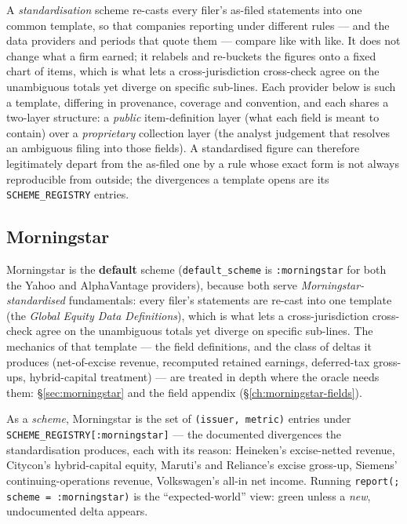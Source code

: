 \documentclass[11pt,a4paper]{report}
\begin{document}
A \emph{standardisation} scheme re-casts every filer's as-filed statements into one common template, so that
companies reporting under different rules --- and the data providers and periods that quote them --- compare
like with like. It does not change what a firm earned; it relabels and re-buckets the figures onto a fixed
chart of items, which is what lets a cross-jurisdiction cross-check agree on the unambiguous totals yet
diverge on specific sub-lines. Each provider below is such a template, differing in provenance, coverage and
convention, and each shares a two-layer structure: a \emph{public} item-definition layer (what each field is
meant to contain) over a \emph{proprietary} collection layer (the analyst judgement that resolves an ambiguous
filing into those fields). A standardised figure can therefore legitimately depart from the as-filed one by a
rule whose exact form is not always reproducible from outside; the divergences a template opens are its
\texttt{SCHEME\_REGISTRY} entries.

\subsection{Morningstar}
\label{sec:schemes-morningstar}

Morningstar is the \textbf{default} scheme (\texttt{default\_scheme} is \texttt{:morningstar} for both the
Yahoo and AlphaVantage providers), because both serve \emph{Morningstar-standardised} fundamentals: every
filer's statements are re-cast into one template (the \emph{Global Equity Data Definitions}), which is what
lets a cross-jurisdiction cross-check agree on the unambiguous totals yet diverge on specific sub-lines. The
mechanics of that template --- the field definitions, and the class of deltas it produces (net-of-excise
revenue, recomputed retained earnings, deferred-tax gross-ups, hybrid-capital treatment) --- are treated in
depth where the oracle needs them: \S\ref{sec:morningstar} and the field appendix
(\S\ref{ch:morningstar-fields}).

As a \emph{scheme}, Morningstar is the set of \texttt{(issuer, metric)} entries under
\texttt{SCHEME\_REGISTRY[:morningstar]} --- the documented divergences the standardisation produces, each with
its reason: Heineken's excise-netted revenue, Citycon's hybrid-capital equity, Maruti's and Reliance's excise
gross-up, Siemens' continuing-operations revenue, Volkswagen's all-in net income. Running
\texttt{report(; scheme = :morningstar)} is the ``expected-world'' view: green unless a \emph{new},
undocumented delta appears.
\end{document}
